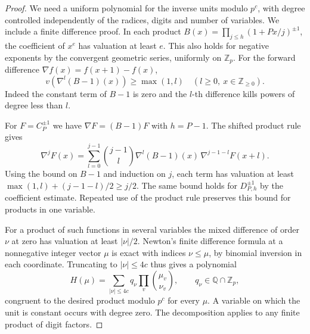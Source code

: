 \begin{proof}
We need a uniform polynomial for the inverse units modulo
\(p^c\), with degree controlled independently of the radices,
digits and number of variables. We include a finite difference
proof. In each product \(B(x)=\prod_{j\le h}(1+Px/j)^{\pm1}\),
the coefficient of \(x^e\) has valuation at least \(e\). This
also holds for negative exponents by the convergent geometric
series, uniformly on \(\mathbb Z_p\). For the forward difference
\(\nabla f(x)=f(x+1)-f(x)\),
\[
 v(\nabla^l(B-1)(x))\ge\max(1,l)
       \quad (l\ge0,\ x\in\mathbb Z_{\ge0}).
\]
Indeed the constant term of \(B-1\) is zero and the \(l\)-th
difference kills powers of degree less than \(l\).

For \(F=C_P^{\pm1}\) we have \(\nabla F=(B-1)F\) with \(h=P-1\).
The shifted product rule gives
\[
 \nabla^j F(x)
   =\sum_{l=0}^{j-1}\binom{j-1}{l}
       \nabla^l(B-1)(x)\,\nabla^{j-1-l}F(x+l).
\]
Using the bound on \(B-1\) and induction on \(j\), each term
has valuation at least \(\max(1,l)+(j-1-l)/2\ge j/2\). The same bound holds for
\(D_{P,h}^{\pm1}\) by the coefficient estimate. Repeated use of
the product rule preserves this bound for products in one
variable.

For a product of such functions in several variables
the mixed difference of order \(\nu\) at zero has valuation
at least \(|\nu|/2\). Newton's finite difference formula at a
nonnegative integer vector \(\mu\) is exact with indices
\(\nu\le\mu\), by binomial inversion in each coordinate.
Truncating to \(|\nu|\le4c\) thus gives a polynomial
\[
 H(\mu)=\sum_{|\nu|\le4c} q_\nu\prod_v\binom{\mu_v}{\nu_v},
 \qquad q_\nu\in\mathbb Q\cap\mathbb Z_p,
\]
congruent to the desired product modulo \(p^c\) for every
\(\mu\). A variable on which the unit is constant occurs with
degree zero. The decomposition applies to any finite product of digit factors.

\end{proof}

